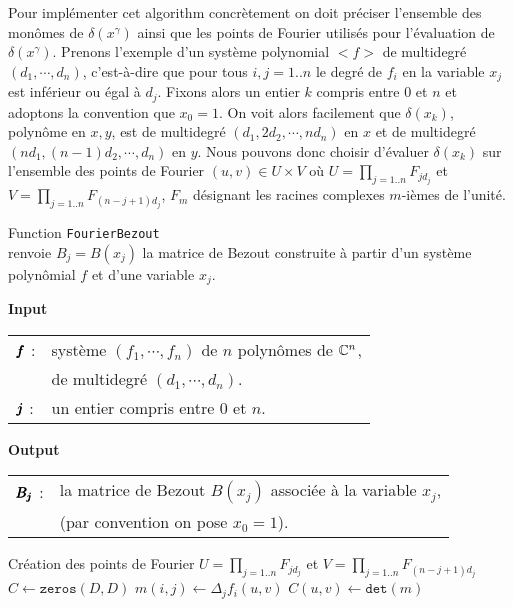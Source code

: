 \documentclass{standalone}
\begin{document}
Pour implémenter cet algorithm concrètement on doit préciser l'ensemble des monômes de $\delta(x^\gamma)$ ainsi que les points de Fourier utilisés pour l'évaluation de $\delta(x^\gamma)$. Prenons l'exemple d'un système polynomial $<f>$ de multidegré $(d_1, \cdots, d_n)$, c'est-à-dire que pour tous $i, j = 1..n$ le degré de $f_i$ en la variable $x_j$ est inférieur ou égal à $d_j$. Fixons alors un entier $k$ compris entre $0$ et $n$ et adoptons la convention que $x_0 = 1$. On voit alors facilement que $\delta(x_k)$, polynôme en $x, y$, est de multidegré $(d_1, 2d_2, \cdots, nd_n)$ en $x$
et de multidegré $(nd_1, (n-1)d_2, \cdots, d_n)$ en $y$. Nous pouvons donc choisir d'évaluer $\delta(x_k)$ sur l'ensemble des points de Fourier $(u, v) \in U\times V$ o\`u $U = \prod_{j=1..n} F_{jd_j}$ et $V = \prod_{j=1..n} F_{(n-j+1)d_j}$, $F_m$ désignant les racines complexes $m$-ièmes de l'unité.
\begin{algorithm}[H]
\caption{Function \texttt{FourierBezout}\\ renvoie $B_j = B(x_j)$  la matrice de Bezout construite à partir d'un système polynômial $f$ et d'une variable $x_j$.}\label{algo:01}
\textbf{Input}
  \begin{tabular}[t]{ll}
    $\pmb{f}$  : &  système $(f_1, \cdots, f_n)$ de $n$ polynômes de $\mathbb{C}^n$,\\ {} & de multidegré $(d_1, \cdots, d_n)$.\\
     $\pmb{j}$ : & un entier compris entre $0$ et $n$.
  \end{tabular}

\textbf{Output}
  \begin{tabular}[t]{ll}
      $\pmb{B_j}$ : & la matrice de Bezout $B(x_j)$ associée à la variable $x_j$,\\
      {} & (par convention on pose $x_0 = 1$).
  \end{tabular}
\begin{algorithmic}
	\State Création des points de Fourier $U = \prod_{j=1..n} F_{jd_j}$ et $V = \prod_{j=1..n} F_{(n-j+1)d_j}$
	\State $C \gets \texttt{zeros}(D, D)$
      		\State $m(i, j) \gets \Delta_j f_i(u, v)$
   		\EndFor
		\State $C(u, v) \gets \texttt{det}(m)$
	\EndFor
\EndFunction
\end{algorithmic}
\end{algorithm}
\end{document}
